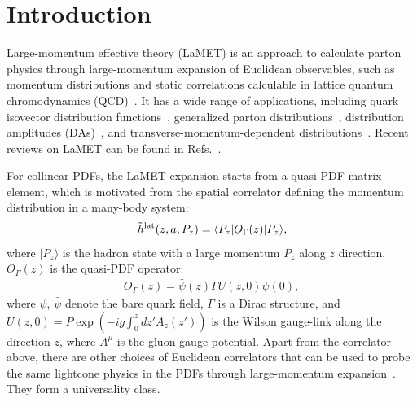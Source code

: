\documentclass[prd,aps,twocolumn,preprintnumbers, showpacs, nofootinbib,superscriptaddress,notitlepage]{revtex4-2}
\def\bea{\begin{eqnarray}}
\def\eea{\end{eqnarray}}
\begin{document}
\maketitle

\section{Introduction}\label{sec:intro}


Large-momentum effective theory (LaMET) is an approach to calculate
parton physics through large-momentum expansion of Euclidean observables, such 
as momentum distributions and static correlations
calculable in lattice quantum chromodynamics (QCD)~\cite{Ji:2013dva,Ji:2014hxa}. 
It has a wide range of applications, including quark isovector distribution functions~\cite{Lin:2014zya,Alexandrou:2015rja,Chen:2016utp,Alexandrou:2016jqi,Alexandrou:2018pbm,Chen:2018xof,Lin:2018pvv,Liu:2018uuj,Alexandrou:2018eet,Liu:2018hxv,Chen:2018fwa,Izubuchi:2019lyk,Shugert:2020tgq,Chai:2020nxw,Lin:2020ssv,Fan:2020nzz,Gao:2021dbh,Gao:2022iex}, generalized parton distributions~\cite{Chen:2019lcm,Alexandrou:2019dax,Lin:2020rxa,Alexandrou:2020zbe,Lin:2021brq,Scapellato:2022mai}, distribution amplitudes (DAs)~\cite{Zhang:2017bzy,Chen:2017gck,Zhang:2020gaj,Hua:2020gnw, Hua:2022kcm}, and transverse-momentum-dependent distributions~\cite{Shanahan:2019zcq,Shanahan:2020zxr,Zhang:2020dbb,LPC:2022ibr}. Recent reviews on LaMET can be found in Refs.~\cite{Cichy:2018mum,Ji:2020ect}.

For collinear PDFs, the LaMET expansion starts from a quasi-PDF matrix element, which is motivated from the spatial correlator defining the momentum distribution in a many-body system:
\bea\label{eq:quasi}
\tilde{h}^{\rm lat}(z, a, P_{z}) = \langle P_z| O_{\Gamma}(z)|P_z \rangle,
\eea
where $|P_z\rangle$ is the hadron state with a large momentum $P_z$ along $z$ direction.
 $O_{\Gamma}(z)$ is the quasi-PDF operator:
\bea\label{eq:operator}
O_{\Gamma}(z)=\bar{\psi}(z) \Gamma U(z,0) \psi (0),
\eea
where $\psi$, $\bar{\psi}$ denote the bare quark field, $\Gamma$ is a Dirac structure,  and $U(z, 0) = P\exp(-ig\int_0^{z} dz' A_z(z'))$ is the Wilson gauge-link along the direction $z$, where $A^\mu$ is the gluon gauge potential. Apart from the correlator above, there are other choices of Euclidean correlators that can be used to probe the same lightcone physics in the PDFs through large-momentum expansion~\cite{Ji:2020ect}. They form a universality class.
\end{document}
